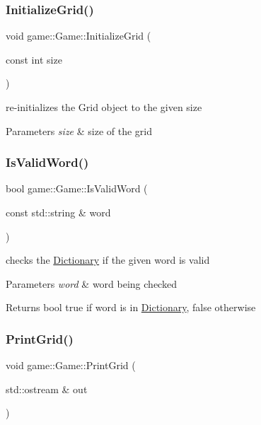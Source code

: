 \subsubsection{\texorpdfstring{Initialize\+Grid()}{InitializeGrid()}}
{\footnotesize\ttfamily void game\+::\+Game\+::\+Initialize\+Grid (\begin{DoxyParamCaption}\item[{const int}]{size }\end{DoxyParamCaption})}



re-\/initializes the Grid object to the given size 


\begin{DoxyParams}{Parameters}
{\em size} & size of the grid \\
\hline
\end{DoxyParams}
\mbox{\label{classgame_1_1Game_a729991a58de1542bdda32a0cc2778899}} 
\subsubsection{\texorpdfstring{Is\+Valid\+Word()}{IsValidWord()}}
{\footnotesize\ttfamily bool game\+::\+Game\+::\+Is\+Valid\+Word (\begin{DoxyParamCaption}\item[{const std\+::string \&}]{word }\end{DoxyParamCaption})}



checks the \hyperlink{classgame_1_1Dictionary}{Dictionary} if the given word is valid 


\begin{DoxyParams}{Parameters}
{\em word} & word being checked \\
\hline
\end{DoxyParams}
\begin{DoxyReturn}{Returns}
bool true if word is in \hyperlink{classgame_1_1Dictionary}{Dictionary}, false otherwise 
\end{DoxyReturn}
\mbox{\label{classgame_1_1Game_aa86e27688c8e1d513c47afc53467dbea}} 
\subsubsection{\texorpdfstring{Print\+Grid()}{PrintGrid()}}
{\footnotesize\ttfamily void game\+::\+Game\+::\+Print\+Grid (\begin{DoxyParamCaption}\item[{std\+::ostream \&}]{out }\end{DoxyParamCaption})}



